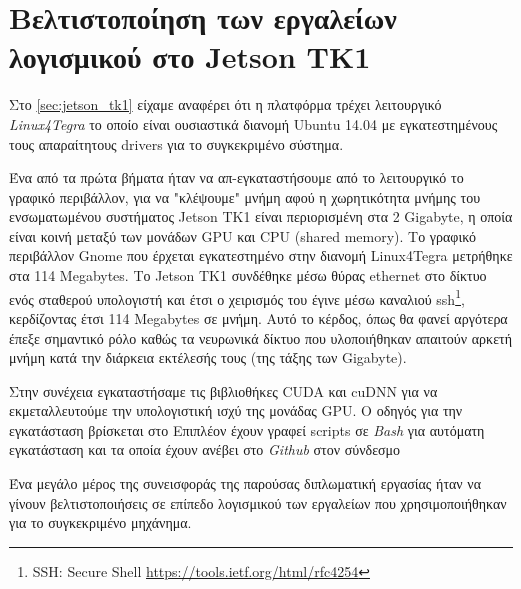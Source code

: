 \section{Βελτιστοποίηση των εργαλείων λογισμικού στο Jetson TK1}
\label{sec:implementations_jetson}

Στο \autoref{sec:jetson_tk1} είχαμε αναφέρει ότι η πλατφόρμα τρέχει
λειτουργικό \emph{Linux4Tegra} το οποίο είναι ουσιαστικά διανομή Ubuntu 14.04
με εγκατεστημένους τους απαραίτητους drivers για το συγκεκριμένο σύστημα.


Ένα από τα πρώτα βήματα ήταν να απ-εγκαταστήσουμε από το λειτουργικό το
γραφικό περιβάλλον, για να "κλέψουμε" μνήμη αφού η χωρητικότητα μνήμης
του ενσωματωμένου συστήματος Jetson TK1 είναι περιορισμένη στα 2 Gigabyte,
η οποία είναι κοινή μεταξύ των μονάδων GPU και CPU (shared memory).
Το γραφικό περιβάλλον Gnome
που έρχεται εγκατεστημένο στην διανομή Linux4Tegra μετρήθηκε στα 114 Megabytes.
Το Jetson TK1 συνδέθηκε
μέσω θύρας ethernet στο δίκτυο ενός σταθερού υπολογιστή και έτσι ο χειρισμός
του έγινε μέσω καναλιού ssh\footnote{SSH: Secure Shell \href{https://tools.ietf.org/html/rfc4254}{{https://tools.ietf.org/html/rfc4254}}},
κερδίζοντας έτσι 114 Megabytes σε μνήμη. Αυτό το κέρδος, όπως θα φανεί
αργότερα έπεξε σημαντικό ρόλο καθώς τα νευρωνικά δίκτυο που υλοποιήθηκαν
απαιτούν αρκετή μνήμη κατά την διάρκεια εκτέλεσής τους (της τάξης των Gigabyte).

Στην συνέχεια εγκαταστήσαμε τις βιβλιοθήκες CUDA και cuDNN για να εκμεταλλευτούμε
την υπολογιστική ισχύ της μονάδας GPU. Ο οδηγός για την εγκατάσταση βρίσκεται
στο %
Επιπλέον έχουν γραφεί scripts σε \emph{Bash} για αυτόματη εγκατάσταση και τα
οποία έχουν ανέβει στο \emph{Github} στον σύνδεσμο %

Ένα μεγάλο μέρος της συνεισφοράς της παρούσας διπλωματική εργασίας
ήταν να γίνουν βελτιστοποιήσεις σε επίπεδο λογισμικού των εργαλείων που χρησιμοποιήθηκαν
για το συγκεκριμένο μηχάνημα.


